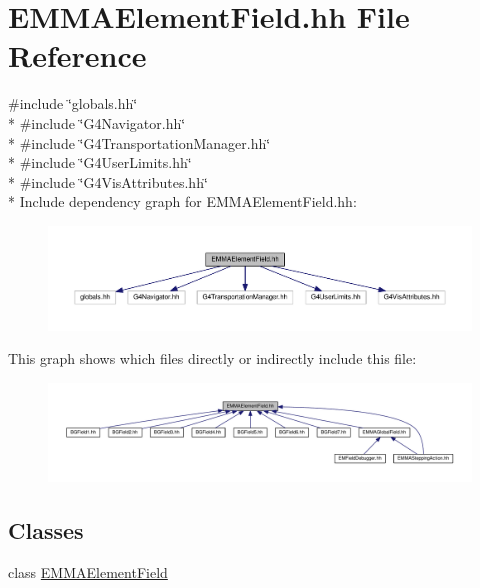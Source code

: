 \hypertarget{EMMAElementField_8hh}{}\section{E\+M\+M\+A\+Element\+Field.\+hh File Reference}
\label{EMMAElementField_8hh}
{\ttfamily \#include \char`\"{}globals.\+hh\char`\"{}}\\*
{\ttfamily \#include \char`\"{}G4\+Navigator.\+hh\char`\"{}}\\*
{\ttfamily \#include \char`\"{}G4\+Transportation\+Manager.\+hh\char`\"{}}\\*
{\ttfamily \#include \char`\"{}G4\+User\+Limits.\+hh\char`\"{}}\\*
{\ttfamily \#include \char`\"{}G4\+Vis\+Attributes.\+hh\char`\"{}}\\*
Include dependency graph for E\+M\+M\+A\+Element\+Field.\+hh\+:
\nopagebreak
\begin{figure}[H]
\begin{center}
\leavevmode
\includegraphics[width=350pt]{EMMAElementField_8hh__incl}
\end{center}
\end{figure}
This graph shows which files directly or indirectly include this file\+:
\nopagebreak
\begin{figure}[H]
\begin{center}
\leavevmode
\includegraphics[width=350pt]{EMMAElementField_8hh__dep__incl}
\end{center}
\end{figure}
\subsection*{Classes}
\begin{DoxyCompactItemize}
\item 
class \hyperlink{classEMMAElementField}{E\+M\+M\+A\+Element\+Field}
\end{DoxyCompactItemize}
